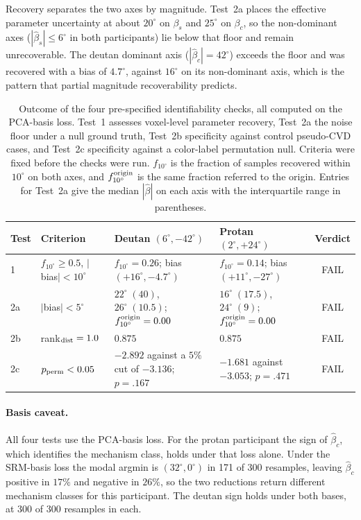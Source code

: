 Recovery separates the two axes by magnitude. Test~2a places the effective parameter uncertainty at about $20^\circ$ on $\beta_s$ and $25^\circ$ on $\beta_c$, so the non-dominant axes ($|\hat\beta_s| \leq 6^\circ$ in both participants) lie below that floor and remain unrecoverable. The deutan dominant axis ($|\hat\beta_c| = 42^\circ$) exceeds the floor and was recovered with a bias of $4.7^\circ$, against $16^\circ$ on its non-dominant axis, which is the pattern that partial magnitude recoverability predicts.

\begin{table}[h]
\centering
\caption{Outcome of the four pre-specified identifiability checks, all computed on the PCA-basis loss. Test~1 assesses voxel-level parameter recovery, Test~2a the noise floor under a null ground truth, Test~2b specificity against control pseudo-CVD cases, and Test~2c specificity against a color-label permutation null. Criteria were fixed before the checks were run. $f_{10^\circ}$ is the fraction of samples recovered within $10^\circ$ on both axes, and $f_{10^\circ}^{\rm origin}$ is the same fraction referred to the origin. Entries for Test~2a give the median $|\hat\beta|$ on each axis with the interquartile range in parentheses.}
\label{tab:identifiability}
\small
\begin{tabularx}{\textwidth}{llYYc}
\toprule
Test & Criterion & Deutan $(6^\circ, -42^\circ)$ & Protan $(2^\circ, +24^\circ)$ & Verdict \\
   & $f_{10^\circ} \geq 0.5$, $|$bias$| < 10^\circ$ & $f_{10^\circ} = 0.26$; bias $(+16^\circ, -4.7^\circ)$ & $f_{10^\circ} = 0.14$; bias $(+11^\circ, -27^\circ)$ & FAIL \\
2a  & $|$bias$| < 5^\circ$ & $22^\circ\;(40)$, $26^\circ\;(10.5)$; $f_{10^\circ}^{\rm origin} = 0.00$ & $16^\circ\;(17.5)$, $24^\circ\;(9)$; $f_{10^\circ}^{\rm origin} = 0.00$ & FAIL \\
2b  & rank$_{\rm dist} = 1.0$ & $0.875$ & $0.875$ & FAIL \\
2c  & $p_{\rm perm} < 0.05$ & $-2.892$ against a $5\%$ cut of $-3.136$; $p = .167$ & $-1.681$ against $-3.053$; $p = .471$ & FAIL \\
\bottomrule
\end{tabularx}
\end{table}

\paragraph{Basis caveat.}
All four tests use the PCA-basis loss. For the protan participant the sign of $\hat\beta_c$, which identifies the mechanism class, holds under that loss alone. Under the SRM-basis loss the modal argmin is $(32^\circ, 0^\circ)$ in 171 of 300 resamples, leaving $\hat\beta_c$ positive in $17\%$ and negative in $26\%$, so the two reductions return different mechanism classes for this participant. The deutan sign holds under both bases, at $300$ of $300$ resamples in each.

